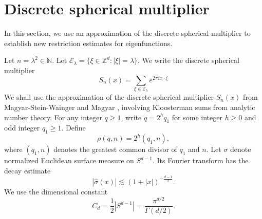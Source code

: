 \documentclass[11pt,reqno]{amsart}
\numberwithin{equation}{section}
\newcommand{\1}{\textbf{1}}
\newcommand{\ls}{\lesssim}
\newcommand{\la}{\lambda}
\newcommand{\E}{\mathcal{E}}
\begin{document}
	\section{Discrete spherical multiplier}\label{sec4}
	
	In this section, we use an approximation of the discrete spherical multiplier to establish new restriction estimates for eigenfunctions. 
	
	Let $n=\la^2\in \mathbb{N}$. Let $\E_\la=\{\xi\in \mathbb{Z}^d:|\xi|=\la\}$. We write the discrete spherical multiplier
	\[
	S_n(x)=\sum_{\xi\in \E_\la}e^{2\pi i x\cdot \xi}
	\]
	We shall use the approximation of the discrete spherical multiplier $S_n(x)$ from Magyar-Stein-Wainger \cite[Section 3]{msw} and Magyar \cite[Lemma 1]{m}, involving Kloosterman sums from analytic number theory. For any integer $q\ge1$, write $q=2^h q_1$ for some integer $h\ge0$ and odd integer $q_1\ge1$. Define
	\[
	\rho(q,n)=2^{h}(q_1,n),
	\]
	where $(q_1,n)$ denotes the greatest common divisor of $q_1$ and $n$.
	Let \(\sigma\) denote normalized Euclidean surface measure on
	\(S^{d-1}\). Its Fourier transform has the decay estimate
	\begin{equation}
		|\hat\sigma(x)|\ls (1+|x|)^{-\frac{d-1}2}.
	\end{equation}
	We use the dimensional constant
	\begin{equation}\label{eq:Cd-definition}
		C_d=\frac12|S^{d-1}|=\frac{\pi^{d/2}}{\Gamma(d/2)}.
	\end{equation}
	
\end{document}

